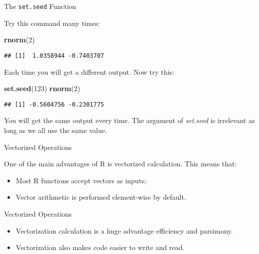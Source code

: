 \documentclass[ignorenonframetext,]{beamer}
\newenvironment{Shaded}{\begin{snugshade}}{\end{snugshade}}
\newcommand{\DecValTok}[1]{\textcolor[rgb]{0.00,0.00,0.81}{#1}}
\newcommand{\KeywordTok}[1]{\textcolor[rgb]{0.13,0.29,0.53}{\textbf{#1}}}
\newcommand{\NormalTok}[1]{#1}
\begin{document}
\begin{frame}[fragile]{The \texttt{set.seed} Function}
\protect\hypertarget{the-set.seed-function-1}{}

Try this command many times:

\begin{Shaded}
\begin{Highlighting}[]
\KeywordTok{rnorm}\NormalTok{(}\DecValTok{2}\NormalTok{) }
\end{Highlighting}
\end{Shaded}

\begin{verbatim}
## [1]  1.0358944 -0.7403707
\end{verbatim}

Each time you will get a different output. Now try this:

\begin{Shaded}
\begin{Highlighting}[]
\KeywordTok{set.seed}\NormalTok{(}\DecValTok{123}\NormalTok{)}
\KeywordTok{rnorm}\NormalTok{(}\DecValTok{2}\NormalTok{)}
\end{Highlighting}
\end{Shaded}

\begin{verbatim}
## [1] -0.5604756 -0.2301775
\end{verbatim}

You will get the same output every time. The argument of
\textit{set.seed} is irrelevant as long as we all use the same value.

\end{frame}

\begin{frame}{Vectorized Operations}
\protect\hypertarget{vectorized-operations}{}

One of the main advantages of R is vectorized calculation. This means
that:

\begin{itemize}
\item
  Most R functions accept vectors as inputs;
\item
  Vector arithmetic is performed element-wise by default.
\end{itemize}

\end{frame}

\begin{frame}{Vectorized Operations}
\protect\hypertarget{vectorized-operations-1}{}

\begin{itemize}
\item
  Vectorization calculation is a huge advantage efficiency and
  parsimony.
\item
  Vectorization also makes code easier to write and read.
\end{itemize}

\end{frame}
\end{document}
